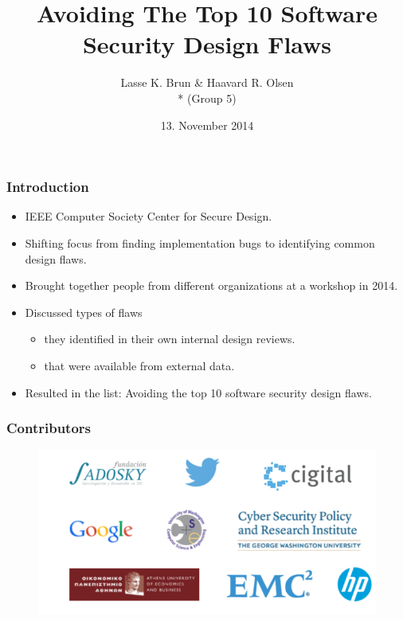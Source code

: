 \documentclass[12pt,norsk]{beamer}
\title[Avoiding The Top 10 Software Security Design Flaws]{Avoiding The Top 10 Software Security Design Flaws}
\author{Lasse K. Brun \& Haavard R. Olsen \\* (Group 5)} %
\institute[UiB]
{
\medskip
\textit{lkbrun@gmail.com \& haavard.olsen@live.com} \\* %
\textit{INF226 - Software Security, Fall 2014 }
}
\date{13. November 2014} %
\begin{document}
 

\begin{frame}
\titlepage %
\end{frame}


\begin{frame}
	
	\frametitle{Introduction}

	\begin{itemize}
		\item IEEE Computer Society Center for Secure Design.
		\item Shifting focus from finding implementation bugs to identifying common design flaws.
		\item Brought together people from different organizations at a workshop in 2014.
		\item Discussed types of flaws
		\begin{itemize}
			\item they identified in their own internal design reviews.
			\item that were available from external data.
		\end{itemize}
		\item Resulted in the list: Avoiding the top 10 software security design flaws.\cite{t10ssdf}
	\end{itemize}		

\end{frame}


\begin{frame}
	
	\frametitle{Contributors}
	
	\begin{figure}[h]
    \centering
    \includegraphics[scale=0.50]{images/contributors.png}
    
\end{figure}
	
\end{frame}
\end{document}
